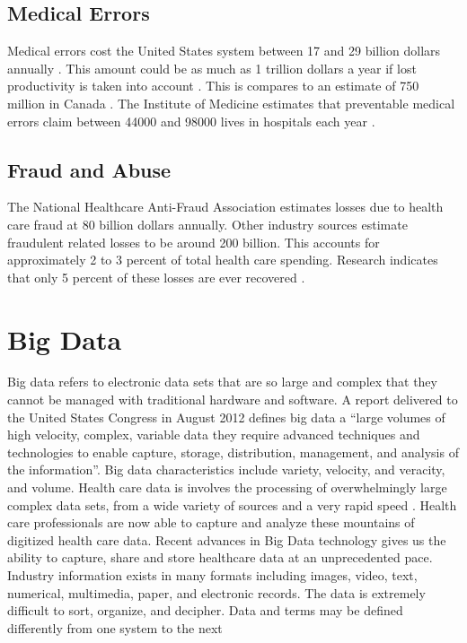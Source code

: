 \documentclass[sigconf]{acmart}
\begin{document}
\subsection{Medical Errors}
Medical errors cost the United States system between 17 and 29 billion dollars annually \cite{Milman}. This amount could be as much as 1 trillion dollars a year if lost productivity is taken into account \cite{www-google-pracfus}. This is compares to an estimate of 750 million in Canada \cite{Milman}.  The Institute of Medicine estimates that preventable medical errors claim between 44000 and 98000 lives in hospitals each year \cite{milbank}.

\subsection{Fraud and Abuse}
The National Healthcare Anti-Fraud Association estimates losses due to health care fraud at 80 billion dollars annually. Other industry sources estimate fraudulent related losses to be around 200 billion. This accounts for approximately 2 to 3 percent of total health care spending. Research indicates that only 5 percent of these losses are ever recovered \cite{www-google-datameer}.

\section{Big Data}

Big data refers to electronic data sets that are so large and complex that they cannot be managed with traditional hardware and software. A report delivered to the United States Congress in August 2012 defines big data a “large volumes of high velocity, complex, variable data they require advanced techniques and technologies to enable capture, storage, distribution, management, and analysis of the information”. Big data characteristics include variety, velocity, and veracity, and volume.  Health care data is involves the processing of overwhelmingly large complex data sets, from a wide variety of sources and a very rapid speed \cite{springer}.  Health care professionals are now able to capture and analyze these mountains of digitized health care data. Recent advances in Big Data technology gives us the ability to capture, share and store healthcare data at an unprecedented pace. Industry information exists in many formats including images, video, text, numerical, multimedia, paper, and electronic records. The data is extremely difficult to sort, organize, and decipher.  Data and terms may be defined differently from one system to the next \cite{www-google-digit}
\end{document}
